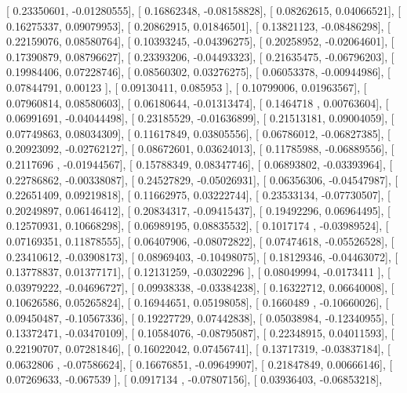 \documentclass{article}
\begin{document}
       [ 0.23350601, -0.01280555],
       [ 0.16862348, -0.08158828],
       [ 0.08262615,  0.04066521],
       [ 0.16275337,  0.09079953],
       [ 0.20862915,  0.01846501],
       [ 0.13821123, -0.08486298],
       [ 0.22159076,  0.08580764],
       [ 0.10393245, -0.04396275],
       [ 0.20258952, -0.02064601],
       [ 0.17390879,  0.08796627],
       [ 0.23393206, -0.04493323],
       [ 0.21635475, -0.06796203],
       [ 0.19984406,  0.07228746],
       [ 0.08560302,  0.03276275],
       [ 0.06053378, -0.00944986],
       [ 0.07844791,  0.00123   ],
       [ 0.09130411,  0.085953  ],
       [ 0.10799006,  0.01963567],
       [ 0.07960814,  0.08580603],
       [ 0.06180644, -0.01313474],
       [ 0.1464718 ,  0.00763604],
       [ 0.06991691, -0.04044498],
       [ 0.23185529, -0.01636899],
       [ 0.21513181,  0.09004059],
       [ 0.07749863,  0.08034309],
       [ 0.11617849,  0.03805556],
       [ 0.06786012, -0.06827385],
       [ 0.20923092, -0.02762127],
       [ 0.08672601,  0.03624013],
       [ 0.11785988, -0.06889556],
       [ 0.2117696 , -0.01944567],
       [ 0.15788349,  0.08347746],
       [ 0.06893802, -0.03393964],
       [ 0.22786862, -0.00338087],
       [ 0.24527829, -0.05026931],
       [ 0.06356306, -0.04547987],
       [ 0.22651409,  0.09219818],
       [ 0.11662975,  0.03222744],
       [ 0.23533134, -0.07730507],
       [ 0.20249897,  0.06146412],
       [ 0.20834317, -0.09415437],
       [ 0.19492296,  0.06964495],
       [ 0.12570931,  0.10668298],
       [ 0.06989195,  0.08835532],
       [ 0.1017174 , -0.03989524],
       [ 0.07169351,  0.11878555],
       [ 0.06407906, -0.08072822],
       [ 0.07474618, -0.05526528],
       [ 0.23410612, -0.03908173],
       [ 0.08969403, -0.10498075],
       [ 0.18129346, -0.04463072],
       [ 0.13778837,  0.01377171],
       [ 0.12131259, -0.0302296 ],
       [ 0.08049994, -0.0173411 ],
       [ 0.03979222, -0.04696727],
       [ 0.09938338, -0.03384238],
       [ 0.16322712,  0.06640008],
       [ 0.10626586,  0.05265824],
       [ 0.16944651,  0.05198058],
       [ 0.1660489 , -0.10660026],
       [ 0.09450487, -0.10567336],
       [ 0.19227729,  0.07442838],
       [ 0.05038984, -0.12340955],
       [ 0.13372471, -0.03470109],
       [ 0.10584076, -0.08795087],
       [ 0.22348915,  0.04011593],
       [ 0.22190707,  0.07281846],
       [ 0.16022042,  0.07456741],
       [ 0.13717319, -0.03837184],
       [ 0.0632806 , -0.07586624],
       [ 0.16676851, -0.09649907],
       [ 0.21847849,  0.00666146],
       [ 0.07269633, -0.067539  ],
       [ 0.0917134 , -0.07807156],
       [ 0.03936403, -0.06853218],
\end{document}
